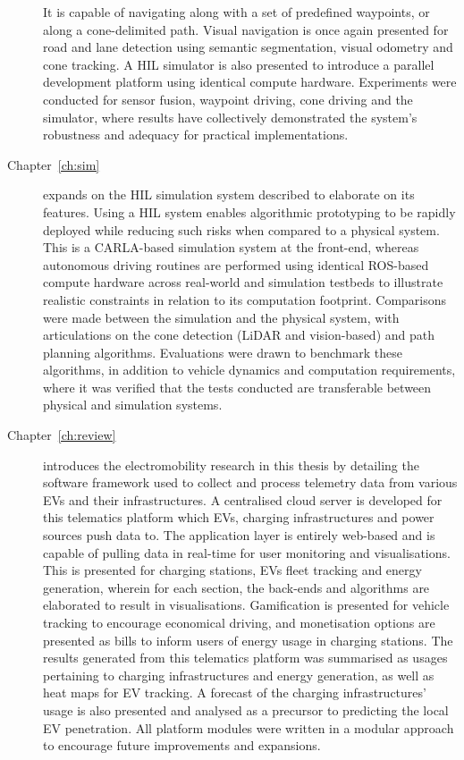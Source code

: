 \begin{description}
	It is capable of navigating along with a set of predefined waypoints, or along a cone-delimited path. Visual navigation is once again presented for road and lane detection using semantic segmentation, visual odometry and cone tracking. A HIL simulator is also presented to introduce a parallel development platform using identical compute hardware. Experiments were conducted for sensor fusion, waypoint driving, cone driving and the simulator, where results have collectively demonstrated the system's robustness and adequacy for practical implementations. 
	\item [Chapter~\ref{ch:sim}] expands on the HIL simulation system described to elaborate on its features. Using a HIL system enables algorithmic prototyping to be rapidly deployed while reducing such risks when compared to a physical system. This is a CARLA-based simulation system at the front-end, whereas autonomous driving routines are performed using identical ROS-based compute hardware across real-world and simulation testbeds to illustrate realistic constraints in relation to its computation footprint. Comparisons were made between the simulation and the physical system, with articulations on the cone detection (LiDAR and vision-based) and path planning algorithms. Evaluations were drawn to benchmark these algorithms, in addition to vehicle dynamics and computation requirements, where it was verified that the tests conducted are transferable between physical and simulation systems.
	\item [Chapter~\ref{ch:review}] introduces the electromobility research in this thesis by detailing the software framework used to collect and process telemetry data from various EVs and their infrastructures. A centralised cloud server is developed for this telematics platform which EVs, charging infrastructures and power sources push data to. The application layer is entirely web-based and is capable of pulling data in real-time for user monitoring and visualisations. This is presented for charging stations, EVs fleet tracking and energy generation, wherein for each section, the back-ends and algorithms are elaborated to result in visualisations. Gamification is presented for vehicle tracking to encourage economical driving, and monetisation options are presented as bills to inform users of energy usage in charging stations. The results generated from this telematics platform was summarised as usages pertaining to charging infrastructures and energy generation, as well as heat maps for EV tracking. A forecast of the charging infrastructures' usage is also presented and analysed as a precursor to predicting the local EV penetration. All platform modules were written in a modular approach to encourage future improvements and expansions.  

\end{description}
